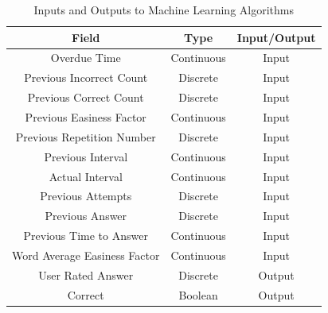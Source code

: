 \begin{table}[h!]
\caption{Inputs and Outputs to Machine Learning Algorithms}
\label{tbl_inputoutputs}
\begin{tabular}{|c|c|c|}
\hline
Field & Type & Input/Output \\
\hline
Overdue Time & Continuous & Input \\
Previous Incorrect Count & Discrete & Input \\
Previous Correct Count & Discrete & Input \\
Previous Easiness Factor & Continuous & Input \\
Previous Repetition Number & Discrete & Input \\
Previous Interval & Continuous & Input \\
Actual Interval & Continuous & Input \\
Previous Attempts & Discrete & Input \\
Previous Answer & Discrete & Input \\
Previous Time to Answer & Continuous & Input \\
Word Average Easiness Factor & Continuous & Input \\
\hline
User Rated Answer & Discrete & Output \\
Correct & Boolean & Output \\
\hline
\end{tabular}
\end{table}